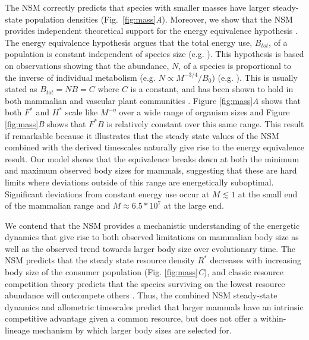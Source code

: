 \documentclass[twocolumn,preprintnumbers,amsmath,amssymb,superscriptaddress]{revtex4}
\begin{document}
The NSM correctly predicts that species with smaller masses have larger
steady-state population densities (Fig.~\ref{fig:mass}\emph{A}).  Moreover,
we show that the NSM provides independent theoretical support for the energy
equivalence hypothesis \cite{allen2002,enquist1998}.  The energy equivalence
hypothesis argues that the total energy use, $B_{tot}$, of a population is
constant independent of species size (e.g.
\cite{allen2002,enquist1998}). %
This hypothesis is based on observations showing that the abundance, $N$, of
a species is proportional to the inverse of individual metabolism
(e.g. $N\propto M^{-3/4}/B_{0}$) (e.g. \cite{allen2002,enquist1998}).  This
is usually stated as $B_{tot}=NB=C$ where $C$ is a constant, and has been
shown to hold in both mammalian and vascular plant communities
\cite{allen2002,enquist1998}.  Figure \ref{fig:mass}\emph{A} shows that both
$F^{*}$ and $H^{*}$ scale like $M^{-\eta}$ over a wide range of organism
sizes and Figure \ref{fig:mass}\emph{B} shows that $F^{*}B$ is relatively
constant over this same range.  This result if remarkable because it
illustrates that the steady state values of the NSM combined with the derived
timescales naturally give rise to the energy equivalence result.  Our model
shows that the equivalence breaks down at both the minimum and maximum
observed body sizes for mammals, suggesting that these are hard limits where
deviations outside of this range are energetically suboptimal.  Significant
deviations from constant energy use occur at $M \lesssim 1$ at the small end
of the mammalian range and $M\approx 6.5*10^7$ at the large end.


We contend that the NSM provides a mechanistic understanding of the energetic
dynamics that give rise to both observed limitations on mammalian body size
as well as the observed trend towards larger body size over evolutionary
time.  The NSM predicts that the steady state resource density $R^{*}$
decreases with increasing body size of the consumer population
(Fig. \ref{fig:mass}\emph{C}), and classic resource competition theory
predicts that the species surviving on the lowest resource abundance will
outcompete others \cite{tilman1981,dutkiewicz2009,barton2010}.  Thus, the
combined NSM steady-state dynamics and allometric timescales predict that
larger mammals have an intrinsic competitive advantage given a common
resource, but does not offer a within-lineage mechanism by which larger body
sizes are selected for.
\end{document}
